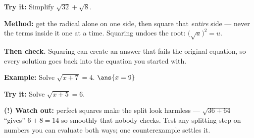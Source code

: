 \documentclass[12pt]{article}
\begin{document}
\begin{tryitbox}
\textbf{Try it:} \quad Simplify $\sqrt{32}+\sqrt{8}$.\\[2pt]
\end{tryitbox}


\begin{formulabox}
\textbf{Method:} get the radical alone on one side, then square that
\emph{entire} side --- never the terms inside it one at a time. Squaring undoes
the root: $\bigl(\sqrt{u}\bigr)^2=u$.\par
\smallskip
\textbf{Then check.} Squaring can create an answer that fails the original
equation, so every solution goes back into the equation you started with.
\end{formulabox}

\begin{examplebox}
\textbf{Example:} \quad Solve $\sqrt{x+7}=4$.
$\ans{x = 9}$
\end{examplebox}

\begin{tryitbox}
\textbf{Try it:} \quad Solve $\sqrt{x+5}=6$.\\[2pt]
\end{tryitbox}

\begin{watchoutbox}
\textbf{(!) Watch out:} perfect squares make the split look harmless ---
$\sqrt{36+64}$ ``gives'' $6+8=14$ so smoothly that nobody checks. Test any
splitting step on numbers you can evaluate both ways; one counterexample
settles it.
\end{watchoutbox}
\end{document}
